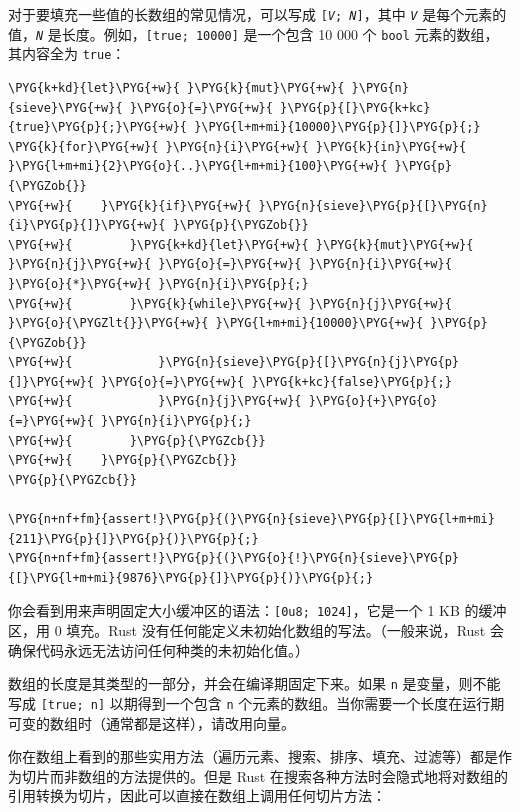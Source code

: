 对于要填充一些值的长数组的常见情况，可以写成 \texttt{[\emph{V}; \emph{N}]}，其中 \emph{\texttt{V}} 是每个元素的值，\emph{\texttt{N}} 是长度。例如，\texttt{[true; 10000]} 是一个包含 10 000 个 \texttt{bool} 元素的数组，其内容全为 \texttt{true}：

\begin{Verbatim}[commandchars=\\\{\},breaklines=true,breakanywhere=true,fontsize=\codefont,xleftmargin=17bp]
\PYG{k+kd}{let}\PYG{+w}{ }\PYG{k}{mut}\PYG{+w}{ }\PYG{n}{sieve}\PYG{+w}{ }\PYG{o}{=}\PYG{+w}{ }\PYG{p}{[}\PYG{k+kc}{true}\PYG{p}{;}\PYG{+w}{ }\PYG{l+m+mi}{10000}\PYG{p}{]}\PYG{p}{;}
\PYG{k}{for}\PYG{+w}{ }\PYG{n}{i}\PYG{+w}{ }\PYG{k}{in}\PYG{+w}{ }\PYG{l+m+mi}{2}\PYG{o}{..}\PYG{l+m+mi}{100}\PYG{+w}{ }\PYG{p}{\PYGZob{}}
\PYG{+w}{    }\PYG{k}{if}\PYG{+w}{ }\PYG{n}{sieve}\PYG{p}{[}\PYG{n}{i}\PYG{p}{]}\PYG{+w}{ }\PYG{p}{\PYGZob{}}
\PYG{+w}{        }\PYG{k+kd}{let}\PYG{+w}{ }\PYG{k}{mut}\PYG{+w}{ }\PYG{n}{j}\PYG{+w}{ }\PYG{o}{=}\PYG{+w}{ }\PYG{n}{i}\PYG{+w}{ }\PYG{o}{*}\PYG{+w}{ }\PYG{n}{i}\PYG{p}{;}
\PYG{+w}{        }\PYG{k}{while}\PYG{+w}{ }\PYG{n}{j}\PYG{+w}{ }\PYG{o}{\PYGZlt{}}\PYG{+w}{ }\PYG{l+m+mi}{10000}\PYG{+w}{ }\PYG{p}{\PYGZob{}}
\PYG{+w}{            }\PYG{n}{sieve}\PYG{p}{[}\PYG{n}{j}\PYG{p}{]}\PYG{+w}{ }\PYG{o}{=}\PYG{+w}{ }\PYG{k+kc}{false}\PYG{p}{;}
\PYG{+w}{            }\PYG{n}{j}\PYG{+w}{ }\PYG{o}{+}\PYG{o}{=}\PYG{+w}{ }\PYG{n}{i}\PYG{p}{;}
\PYG{+w}{        }\PYG{p}{\PYGZcb{}}
\PYG{+w}{    }\PYG{p}{\PYGZcb{}}
\PYG{p}{\PYGZcb{}}

\PYG{n+nf+fm}{assert!}\PYG{p}{(}\PYG{n}{sieve}\PYG{p}{[}\PYG{l+m+mi}{211}\PYG{p}{]}\PYG{p}{)}\PYG{p}{;}
\PYG{n+nf+fm}{assert!}\PYG{p}{(}\PYG{o}{!}\PYG{n}{sieve}\PYG{p}{[}\PYG{l+m+mi}{9876}\PYG{p}{]}\PYG{p}{)}\PYG{p}{;}
\end{Verbatim}

你会看到用来声明固定大小缓冲区的语法：\texttt{[0u8; 1024]}，它是一个 1 KB 的缓冲区，用 0 填充。Rust 没有任何能定义未初始化数组的写法。（一般来说，Rust 会确保代码永远无法访问任何种类的未初始化值。）

数组的长度是其类型的一部分，并会在编译期固定下来。如果 \texttt{n} 是变量，则不能写成 \texttt{[true; n]} 以期得到一个包含 \texttt{n} 个元素的数组。当你需要一个长度在运行期可变的数组时（通常都是这样），请改用向量。

你在数组上看到的那些实用方法（遍历元素、搜索、排序、填充、过滤等）都是作为切片而非数组的方法提供的。但是 Rust 在搜索各种方法时会隐式地将对数组的引用转换为切片，因此可以直接在数组上调用任何切片方法：

